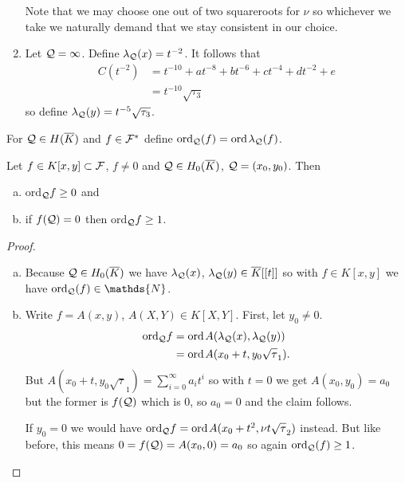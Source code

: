 \documentclass[english,11pt,a4paper]{article}
\begin{document}
\begin{defin}
\begin{enumerate}[1.]
		Note that we may choose one out of two squareroots for $\nu$ so whichever we take we naturally demand that we stay consistent in our choice. %

		\item Let $\mathcal{Q} = \infty$. Define $\lambda_{\mathcal{Q}}(x) = t^{-2}$. It follows that
		\begin{align*}
			C(t^{-2}) &= t^{-10} + at^{-8} + bt^{-6}
											  + ct^{-4}    + dt^{-2} + e\\
											 &= t^{-10} \sqrt{\tau_3}
		\end{align*}
		so define $\lambda_{\mathcal{Q}}(y) = t^{-5} \sqrt{\tau_3}$.
	\end{enumerate}
\end{defin}


\vspace{-3mm}
\fline
\vspace{-3mm}
\begin{defin}
   For $\mathcal{Q} \in H(\overline K)$ and $f \in \mathcal{F}^*$ define $\text{ord}_{\mathcal{Q}} (f) = \text{ord\hspace{0.4mm}} \lambda_{\mathcal{Q}} (f)$.
\end{defin}
\vspace{-5.5mm}
\fline


\begin{lemma}\label{one}
  Let $f \in K[x,y] \subset \mathcal{F}$, $f \neq 0$ and $\mathcal{Q} \in H_0(\overline K)$, $\mathcal{Q} = (x_0,y_0)$. Then
  \begin{enumerate}[(a)]\parskip 1mm
	  \item ord$_{\mathcal{Q}} f \geq 0$ and
	  \item if $f(\mathcal{Q}) = 0$ then ord$_{\mathcal{Q}} f \geq 1$.
	\end{enumerate}\parskip 3mm
	\begin{proof}\hfill
		\begin{enumerate}[(a)]\parskip 1mm
	  	\item Because $\mathcal{Q} \in H_0(\overline K)$ we have $\lambda_{\mathcal{Q}}(x)$, $\lambda_{\mathcal{Q}}(y) \in \overline K[[t]]$ so with $f \in K[x,y]$ we have $\ordq (f) \in \mathds{N}$.
	  	\item Write $f = A(x,y)$, $A(X,Y) \in K[X,Y]$. First, let $y_0 \neq 0$.
	  	\begin{align*}
	  	  \text{ord}_{\mathcal{Q}} f &= \text{ord\hspace{0.4mm}} A(\lambda_{\mathcal{Q}}(x), \lambda_{\mathcal{Q}}(y))\\
	  	  &= \text{ord\hspace{0.4mm}} A(x_0 + t, y_0 \sqrt \tau_1).
	  	\end{align*}
	  	But $A(x_0 + t, y_0 \sqrt \tau_1)=\sum_{i=0}^{\infty} a_i t^i$ so with $t=0$ we get $A(x_0, y_0)=a_0$ but the former is $f(\mathcal{Q})$ which is $0$, so $a_0 = 0$ and the claim follows.

	  	If $y_0 = 0$ we would have $\text{ord}_{\mathcal{Q}} f = \text{ord\hspace{0.4mm}} A(x_0 + t^2, \nu t \sqrt \tau_2)$ instead. But like before, this means $0 = f(\mathcal{Q}) = A(x_0, 0) = a_0$ so again $\text{ord}_{\mathcal{Q}} (f) \geq 1$.
		\end{enumerate}\parskip 3mm
	\end{proof}
\end{lemma}
\end{document}

